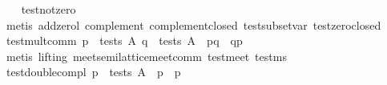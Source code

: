 \begin{isabellebody}
%
\endisadelimproof
\isanewline
\ \ \isamarkupfalse%
\ test{}not{}zero{}\ {}{}{}\ {}\ {}{}\isanewline
%
\isadelimproof
\ \ \ \ %
\endisadelimproof
%
\isatagproof
{}\isamarkupfalse%
\ {}metis\ add{}zerol\ complement{}\ complement{}closed\ test{}subset{}var\ test{}zero{}closed{}%
\endisatagproof
{\isafoldproof}%
%
\isadelimproof
\isanewline
%
\endisadelimproof
\isanewline
\ \ \isamarkupfalse%
\ test{}mult{}comm{}\ {}{}p\ {}\ tests\ A{}\ q\ {}\ tests\ A{}\ {}\ p{}q\ {}\ q{}p{}\isanewline
%
\isadelimproof
\ \ \ \ %
\endisadelimproof
%
\isatagproof
{}\isamarkupfalse%
\ {}metis\ {}lifting{}\ meet{}semilattice{}meet{}comm\ test{}meet\ test{}ms{}%
\endisatagproof
{\isafoldproof}%
%
\isadelimproof
\isanewline
%
\endisadelimproof
\isanewline
\ \ \isamarkupfalse%
\ test{}double{}compl{}\ {}p\ {}\ tests\ A\ {}\ p\ {}\ {}{}{}p{}{}\isanewline

\end{isabellebody}
